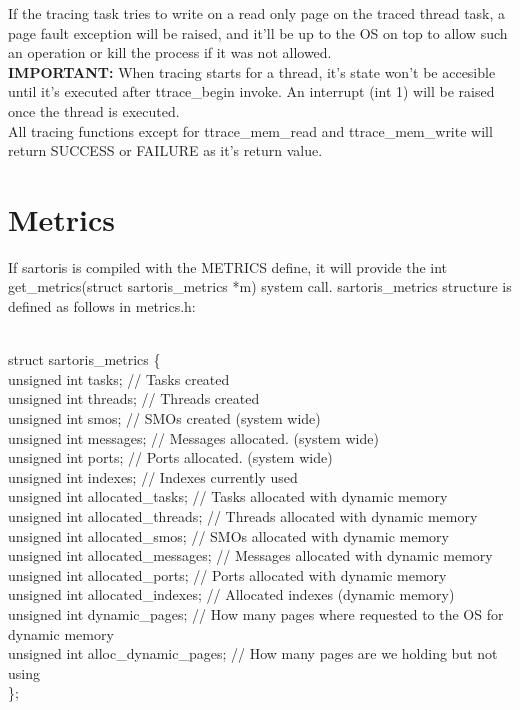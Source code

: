 \documentclass[11pt, letterpaper, twoside, english]{book}
\begin{document}
If the tracing task tries to write on a read only page on the traced thread task, a page fault exception will be raised, and it'll be up to the OS on top to allow such an operation or kill the process if it was not allowed.\\

\textbf{IMPORTANT:} When tracing starts for a thread, it's state won't be accesible until it's executed after \textsf{ttrace\_begin} invoke. An interrupt (int 1) will be raised once the thread is executed.\\

All tracing functions except for \textsf{ttrace\_mem\_read} and \textsf{ttrace\_mem\_write} will return SUCCESS or FAILURE as it's return value.

\section{Metrics} \label{sec:metrics}

If sartoris is compiled with the METRICS define, it will provide the \textsf{int get\_metrics(struct sartoris\_metrics *m)} system call. \textsf{sartoris\_metrics} structure is defined as follows in \textsf{metrics.h}:\\
\\
\begin{sf} \noindent struct sartoris\_metrics \{ \\
\indent unsigned int tasks;                 // Tasks created\\
\indent unsigned int threads;               // Threads created\\
\indent unsigned int smos;									// SMOs created (system wide)\\
\indent unsigned int messages;							// Messages allocated. (system wide)\\
\indent unsigned int ports;									// Ports allocated. (system wide)\\
\indent unsigned int indexes;               // Indexes currently used\\
\indent unsigned int allocated\_tasks;       // Tasks allocated with dynamic memory\\
\indent unsigned int allocated\_threads;     // Threads allocated with dynamic memory\\
\indent unsigned int allocated\_smos;        // SMOs allocated with dynamic memory\\
\indent unsigned int allocated\_messages;    // Messages allocated with dynamic memory\\
\indent unsigned int allocated\_ports;       // Ports allocated with dynamic memory\\
\indent unsigned int allocated\_indexes;     // Allocated indexes (dynamic memory)\\
\indent unsigned int dynamic\_pages;         // How many pages where requested to the OS for dynamic memory\\
\indent unsigned int alloc\_dynamic\_pages;   // How many pages are we holding but not using\\\}; \\
\end{sf}
\\
\end{document}
